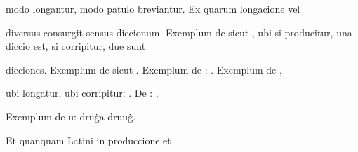 \renewcommand{\theFancyVerbLine}{06-\arabic{FancyVerbLine}\phantom{a}}
%
\begin{VerbatimLatin}[firstnumber=10]
modo longantur, modo patulo breviantur. Ex quarum longacione vel 

 diversus consurgit sensus diccionum. Exemplum de  sicut 
, ubi si  producitur, una diccio est, si corripitur, due sunt

dicciones. Exemplum de  sicut  . Exemplum de :  . Exemplum de , 

ubi longatur, ubi corripitur:  . De :  .
\end{VerbatimLatin}
\renewcommand{\theFancyVerbLine}{\textcolor{green}{06-15\alph{FancyVerbLine}}}
\begin{VerbatimLatin}[firstnumber=1]
Exemplum de u: druġa druuġ.

\indentK Et quanquam Latini in produccione et 
\end{VerbatimLatin}


